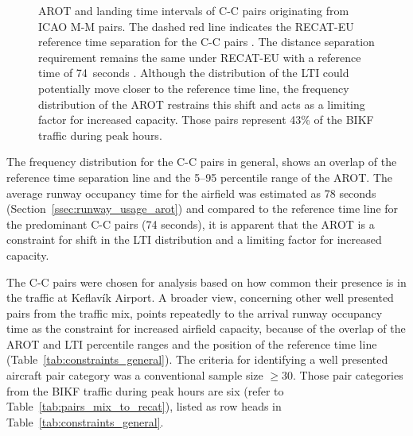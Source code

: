 \begin{figure}[h]
    \caption[AROT and LTI of C-C pairs originating from ICAO M-M pairs]{AROT and landing time intervals of C-C pairs originating from ICAO M-M pairs. The dashed red line indicates the RECAT-EU reference time separation for the C-C pairs \protect{}. The distance separation requirement remains the same under RECAT-EU with a reference time of 74~seconds \protect{}. Although the distribution of the LTI could potentially move closer to the reference time line, the frequency distribution of the AROT restrains this shift and acts as a limiting factor for increased capacity. Those pairs represent 43\% of the BIKF traffic during peak hours.}
    \label{fig:CC_from_MM_pairs_time_sep}
\end{figure}

The frequency distribution for the C-C pairs in general, shows an overlap of the reference time separation line and the 5--95 percentile range of the AROT. The average runway occupancy time for the airfield was estimated as 78 seconds (Section~\ref{ssec:runway_usage_arot}) and compared to the reference time line for the predominant C-C pairs (74 seconds), it is apparent that the AROT is a constraint for shift in the LTI distribution and a limiting factor for increased capacity.

The C-C pairs were chosen for analysis based on how common their presence is in the traffic at Keflavík Airport. A broader view, concerning other well presented pairs from the traffic mix, points repeatedly to the arrival runway occupancy time as the constraint for increased airfield capacity, because of the overlap of the AROT and LTI percentile ranges and the position of the reference time line (Table~\ref{tab:constraints_general}). The criteria for identifying a well presented aircraft pair category was a conventional sample size $\geq30$. Those pair categories from the BIKF traffic during peak hours are six (refer to Table~\ref{tab:pairs_mix_to_recat}), listed as row heads in Table~\ref{tab:constraints_general}. 


